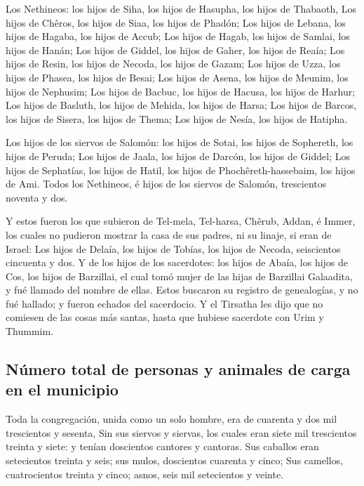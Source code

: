  Los Nethineos: los hijos de Siha, los hijos de Hasupha,
los hijos de Thabaoth,  Los hijos de Chêros, los hijos de
Siaa, los hijos de Phadón;  Los hijos de Lebana, los hijos
de Hagaba, los hijos de Accub;  Los hijos de Hagab, los
hijos de Samlai, los hijos de Hanán;  Los hijos de Giddel,
los hijos de Gaher, los hijos de Reaía;  Los hijos de
Resin, los hijos de Necoda, los hijos de Gazam;  Los hijos
de Uzza, los hijos de Phasea, los hijos de Besai;  Los
hijos de Asena, los hijos de Meunim, los hijos de Nephusim;
 Los hijos de Bacbuc, los hijos de Hacusa, los hijos de
Harhur;  Los hijos de Basluth, los hijos de Mehida, los
hijos de Harsa;  Los hijos de Barcos, los hijos de Sisera,
los hijos de Thema;  Los hijos de Nesía, los hijos de
Hatipha.

 Los hijos de los siervos de Salomón: los hijos de Sotai,
los hijos de Sophereth, los hijos de Peruda;  Los hijos de
Jaala, los hijos de Darcón, los hijos de Giddel;  Los hijos
de Sephatías, los hijos de Hatil, los hijos de Phochêreth-hassebaim, los
hijos de Ami.  Todos los Nethineos, é hijos de los siervos
de Salomón, trescientos noventa y dos.

 Y estos fueron los que subieron de Tel-mela, Tel-harsa,
Chêrub, Addan, é Immer, los cuales no pudieron mostrar la casa de sus
padres, ni su linaje, si eran de Israel:  Los hijos de
Delaía, los hijos de Tobías, los hijos de Necoda, seiscientos cincuenta
y dos.  Y de los hijos de los sacerdotes: los hijos de
Abaía, los hijos de Cos, los hijos de Barzillai, el cual tomó mujer de
las hijas de Barzillai Galaadita, y fué llamado del nombre de ellas.
 Estos buscaron su registro de genealogías, y no fué
hallado; y fueron echados del sacerdocio.  Y el Tirsatha
les dijo que no comiesen de las cosas más santas, hasta que hubiese
sacerdote con Urim y Thummim.

\hypertarget{nuxfamero-total-de-personas-y-animales-de-carga-en-el-municipio}{%
\subsection{Número total de personas y animales de carga en el
municipio}\label{nuxfamero-total-de-personas-y-animales-de-carga-en-el-municipio}}

 Toda la congregación, unida como un solo hombre, era de
cuarenta y dos mil trescientos y sesenta,  Sin sus siervos
y siervas, los cuales eran siete mil trescientos treinta y siete: y
tenían doscientos cantores y cantoras.  Sus caballos eran
setecientos treinta y seis; sus mulos, doscientos cuarenta y cinco;
 Sus camellos, cuatrocientos treinta y cinco; asnos, seis
mil setecientos y veinte.

